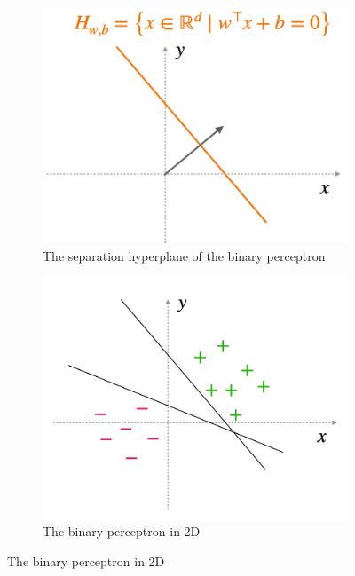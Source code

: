 \documentclass[11pt]{book} %
\begin{document}
\begin{figure}
    \begin{subfigure}{0.5\textwidth}
        \centering
        \includegraphics[width=\linewidth]{Figs/binary_hyperplane.png}
        \caption{The separation hyperplane of the binary perceptron}
    \label{fig:binary_perceptron}
    \end{subfigure}
    \begin{subfigure}{0.5\textwidth}
        \centering
        \includegraphics[width=\linewidth]{Figs/perceptron_2d.png}
        \caption{The binary perceptron in 2D}
    \label{fig:binary_perceptron2}
    \end{subfigure}
\end{figure}
\end{document}
